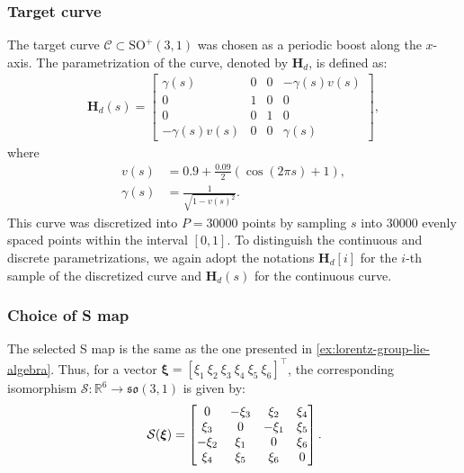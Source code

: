 \subsubsection{Target curve}
The target curve $\mathcal{C} \subset \text{SO}^+(3, 1)$ was chosen as a periodic boost along the $x$-axis. The parametrization of the curve, denoted by $\mathbf{H}_d$, is defined as:
\begin{align}
    \mathbf{H}_d(s) = \begin{bmatrix}
        \gamma(s) & 0 & 0 & -\gamma(s) v(s)\\
        0 & 1 & 0 & 0\\
        0 & 0 & 1 & 0\\
        -\gamma(s) v(s) & 0 & 0 & \gamma(s)
    \end{bmatrix},\label{eq:results-lorentz-curve-parametrization}
\end{align}
where
\begin{align}
    v(s) &= 0.9 + \frac{0.09}{2}(\cos(2\pi s) + 1),\\
    \gamma(s) &= \frac{1}{\sqrt{1 - v(s)^2}}.
\end{align}
This curve was discretized into $P=\num{30000}$ points by sampling $s$ into $\num{30000}$ evenly spaced points within the interval $[0, 1]$. To distinguish the continuous and discrete parametrizations, we again adopt the notations $\mathbf{H}_d[i]$ for the $i$-th sample of the discretized curve and $\mathbf{H}_d(s)$ for the continuous curve.

\subsubsection{Choice of S map}
The selected S map is the same as the one presented in \cref{ex:lorentz-group-lie-algebra}. Thus, for a vector $\boldsymbol{\xi}=[\xi_1\ \xi_2\ \xi_3\ \xi_4\ \xi_5\ \xi_6 ]^\top$, the corresponding isomorphism $\mathcal{S}:\mathbb{R}^6\to\mathfrak{so}(3,1)$ is given by:
\begin{align}
    \SL[\boldsymbol{\xi}] = \begin{bmatrix}
        0 & -\xi_3 & \xi_2 & \xi_4 \\
        \xi_3 & 0 & -\xi_1 & \xi_5 \\
        -\xi_2 & \xi_1 & 0 & \xi_6 \\
        \xi_4 & \xi_5 & \xi_6 & 0
    \end{bmatrix}.
\end{align}
